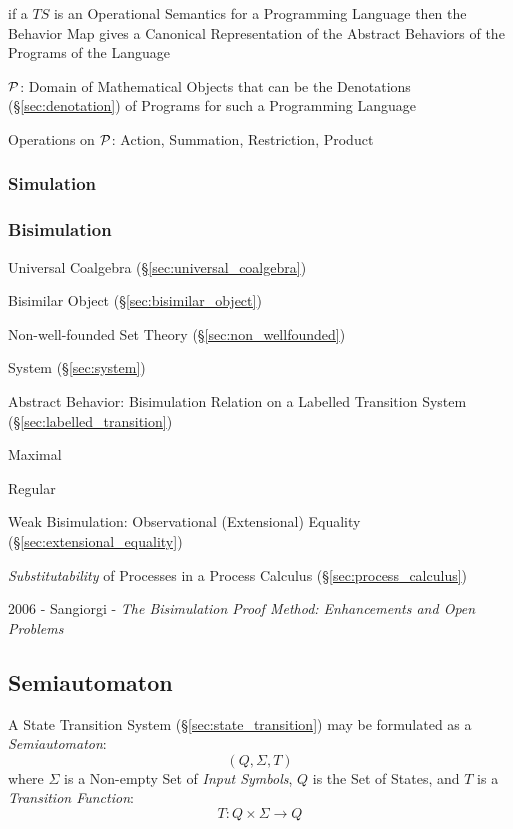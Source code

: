 if a $TS$ is an Operational Semantics for a Programming Language then
the Behavior Map gives a Canonical Representation of the Abstract
Behaviors of the Programs of the Language

$\mathcal{P}$: Domain of Mathematical Objects that can be the
Denotations (\S\ref{sec:denotation}) of Programs for such a
Programming Language

Operations on $\mathcal{P}$: Action, Summation, Restriction, Product



\subsubsection{Simulation} \label{sec:simulation}

\subsubsection{Bisimulation} \label{sec:bisimulation}

Universal Coalgebra (\S\ref{sec:universal_coalgebra})

Bisimilar Object (\S\ref{sec:bisimilar_object})

Non-well-founded Set Theory (\S\ref{sec:non_wellfounded})

System (\S\ref{sec:system})

Abstract Behavior: Bisimulation Relation on a Labelled Transition
System (\S\ref{sec:labelled_transition}) \cite{aczel88}

Maximal

Regular

Weak Bisimulation: Observational (Extensional) Equality
(\S\ref{sec:extensional_equality})

\emph{Substitutability} of Processes in a Process Calculus
(\S\ref{sec:process_calculus})

2006 - Sangiorgi - \emph{The Bisimulation Proof Method: Enhancements and Open
  Problems}



\subsection{Semiautomaton}\label{sec:semiautomaton}

A State Transition System (\S\ref{sec:state_transition}) may be
formulated as a \emph{Semiautomaton}:
\[
  (Q,\Sigma,T)
\]
where $\Sigma$ is a Non-empty Set of \emph{Input Symbols}, $Q$ is the
Set of States, and $T$ is a \emph{Transition Function}:
\[
  T:Q \times \Sigma \rightarrow Q
\]

